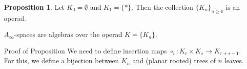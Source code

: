 \documentclass{beamer}
\theoremstyle{definition}
\newtheorem{prop}[teorema]{Proposition}
\begin{document}
\begin{frame}
\begin{prop}
Let $K_0=\emptyset$ and $K_1=\{*\}$. Then the collection $\{K_n\}_{n\geq 0}$ is an operad.
\end{prop}\pause
\begin{corollary}
$A_\infty$-spaces are algebras over the operad $K=\{K_n\}$.
\end{corollary}\pause
\begin{exampleblock}{Proof of Proposition}
We need to define insertion maps $\circ_i:K_r\times K_s\to K_{r+s-1}$. For this, we define a bijection between $K_n$ and (planar rooted) trees of $n$ leaves.
\end{exampleblock}
\end{frame}
\end{document}
